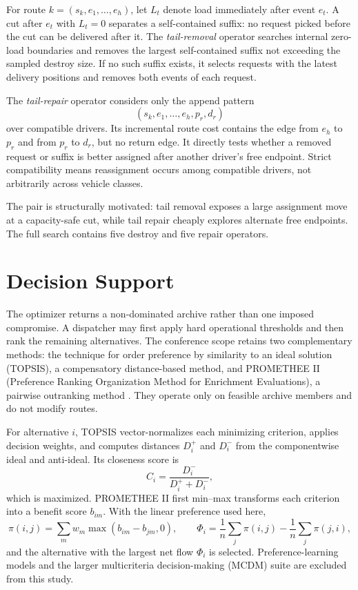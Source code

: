 \documentclass[11pt,a4paper]{article}
\begin{document}
For route $k=(s_k,e_1,\ldots,e_h)$, let $L_t$ denote load immediately after
event $e_t$. A cut after $e_t$ with $L_t=0$ separates a self-contained suffix:
no request picked before the cut can be delivered after it. The
\emph{tail-removal} operator searches internal zero-load boundaries and removes
the largest self-contained suffix not exceeding the sampled destroy size. If no
such suffix exists, it selects requests with the latest delivery positions and
removes both events of each request.

The \emph{tail-repair} operator considers only the append pattern
\[
 (s_k,e_1,\ldots,e_h,p_r,d_r)
\]
over compatible drivers. Its incremental route cost contains the edge from
$e_h$ to $p_r$ and from $p_r$ to $d_r$, but no return edge. It directly tests
whether a removed request or suffix is better assigned after another driver's
free endpoint. Strict compatibility means reassignment occurs among compatible
drivers, not arbitrarily across vehicle classes.

The pair is structurally motivated: tail removal exposes a large assignment
move at a capacity-safe cut, while tail repair cheaply explores alternate free
endpoints. The full search contains five destroy and five repair operators.

\section{Decision Support}

The optimizer returns a non-dominated archive rather than one imposed
compromise. A dispatcher may first apply hard operational thresholds and then
rank the remaining alternatives. The conference scope retains two
complementary methods: the technique for order preference by similarity to an
ideal solution (TOPSIS), a compensatory distance-based method, and PROMETHEE II
(Preference Ranking Organization Method for Enrichment Evaluations), a
pairwise outranking method
\cite{hwang1981topsis,brans1985promethee}. They operate only on feasible archive
members and do not modify routes.

For alternative $i$, TOPSIS vector-normalizes each minimizing criterion,
applies decision weights, and computes distances $D_i^+$ and $D_i^-$ from the
componentwise ideal and anti-ideal. Its closeness score is
\begin{equation}
 C_i=\frac{D_i^-}{D_i^++D_i^-},
\end{equation}
which is maximized. PROMETHEE II first min--max transforms each criterion into
a benefit score $b_{im}$. With the linear preference used here,
\begin{equation}
 \pi(i,j)=\sum_m w_m\max(b_{im}-b_{jm},0),\qquad
 \Phi_i=\frac{1}{n}\sum_j\pi(i,j)-\frac{1}{n}\sum_j\pi(j,i),
\end{equation}
and the alternative with the largest net flow $\Phi_i$ is selected.
Preference-learning models and the larger multicriteria decision-making (MCDM)
suite are excluded from this study.
\end{document}
